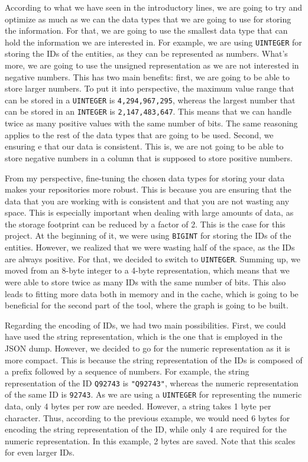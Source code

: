 According to what we have seen in the introductory lines, we are going to try and optimize as much as we can the data types that we are going to use for storing the information. For that, we are going to use the smallest data type that can hold the information we are interested in. For example, we are using \texttt{UINTEGER} for storing the IDs of the entities, as they can be represented as numbers. What's more, we are going to use the unsigned representation as we are not interested in negative numbers. This has two main benefits: first, we are going to be able to store larger numbers. To put it into perspective, the maximum value range that can be stored in a \texttt{UINTEGER} is \texttt{4,294,967,295}, whereas the largest number that can be stored in an \texttt{INTEGER} is \texttt{2,147,483,647}. This means that we can handle twice as many positive values with the same number of bits. The same reasoning applies to the rest of the data types that are going to be used. Second, we ensuring e that our data is consistent. This is, we are not going to be able to store negative numbers in a column that is supposed to store positive numbers.

From my perspective, fine-tuning the chosen data types for storing your data makes your repositories more robust. This is because you are ensuring that the data that you are working with is consistent and that you are not wasting any space. This is especially important when dealing with large amounts of data, as the storage footprint can be reduced by a factor of 2. This is the case for this project. At the beginning of it, we were using \texttt{BIGINT} for storing the IDs of the entities. However, we realized that we were wasting half of the space, as the IDs are always positive. For that, we decided to switch to \texttt{UINTEGER}. Summing up, we moved from an 8-byte integer to a 4-byte representation, which means that we were able to store twice as many IDs with the same number of bits. This also leads to fitting more data both in memory and in the cache, which is going to be beneficial for the second part of the tool, where the graph is going to be built.

Regarding the encoding of IDs, we had two main possibilities. First, we could have used the string representation, which is the one that is employed in the JSON dump. However, we decided to go for the numeric representation as it is more compact. This is because the string representation of the IDs is composed of a prefix followed by a sequence of numbers. For example, the string representation of the ID \texttt{Q92743} is \texttt{"Q92743"}, whereas the numeric representation of the same ID is \texttt{92743}. As we are using a \texttt{UINTEGER} for representing the numeric data, only 4 bytes per row are needed. However, a string takes 1 byte per character. Thus, according to the previous example, we would need 6 bytes for encoding the string representation of the ID, while only 4 are required for the numeric representation. In this example, 2 bytes are saved. Note that this scales for even larger IDs.

